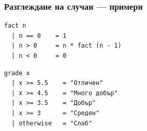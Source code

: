 \documentclass{beamer}
\begin{document}
\begin{frame}[fragile]
  \frametitle{Разглеждане на случаи --- примери}
\begin{verbatim}
fact n
  | n == 0    = 1
  | n > 0     = n * fact (n - 1)
  | n < 0     = 0
\end{verbatim}
\pause\vspace{1em}
\begin{verbatim}
grade x
  | x >= 5.5    = "Отличен"
  | x >= 4.5    = "Много добър"
  | x >= 3.5    = "Добър"
  | x >= 3      = "Среден"
  | otherwise   = "Слаб"
\end{verbatim}
\end{frame}
\end{document}
